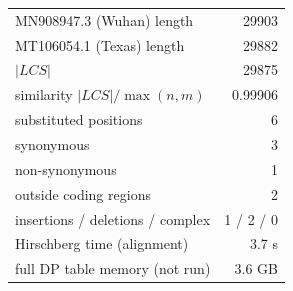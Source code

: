 \begin{tabular}{lr}
\hline
MN908947.3 (Wuhan) length & 29903 \\
MT106054.1 (Texas) length & 29882 \\
$|LCS|$ & 29875 \\
similarity $|LCS| / \max(n, m)$ & 0.99906 \\
substituted positions & 6 \\
\quad synonymous & 3 \\
\quad non-synonymous & 1 \\
\quad outside coding regions & 2 \\
insertions / deletions / complex & 1 / 2 / 0 \\
Hirschberg time (alignment) & 3.7 s \\
full DP table memory (not run) & 3.6 GB \\
\hline
\end{tabular}